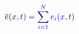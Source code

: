 \documentclass[12pt]{article}
\begin{document}
\makeatletter
\renewcommand*{\@textcolor}[3]{%
  \protect\leavevmode
  \begingroup
    \color#1{#2}#3%
  \endgroup
}
\makeatother
\begin{displaymath}
\mathcolor[RGB]{0,0,15}{\overline { \mathcolor[RGB]{0,0,30}{e} } } \mathcolor[RGB]{0,0,45}{(} \mathcolor[RGB]{0,0,60}{x} \mathcolor[RGB]{0,0,75}{,} \mathcolor[RGB]{0,0,90}{t} \mathcolor[RGB]{0,0,105}{)} \mathcolor[RGB]{0,0,120}{=} \mathcolor[RGB]{0,0,135}{\sum} _ { \mathcolor[RGB]{0,0,150}{i} \mathcolor[RGB]{0,0,165}{=} \mathcolor[RGB]{0,0,180}{1} } ^ { \mathcolor[RGB]{0,0,195}{N} } \mathcolor[RGB]{0,0,210}{e} _ { \mathcolor[RGB]{0,0,225}{i} } \mathcolor[RGB]{0,0,240}{(} \mathcolor[RGB]{0,0,255}{x} \mathcolor[RGB]{0,15,0}{,} \mathcolor[RGB]{0,15,15}{t} \mathcolor[RGB]{0,15,30}{)}
\end{displaymath}
\end{document}
